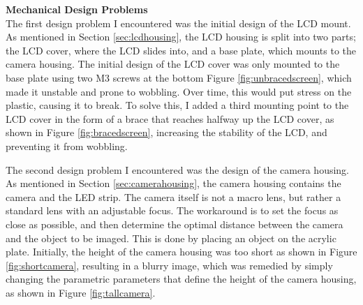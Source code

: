 \noindent
\textbf{Mechanical Design Problems} \\
The first design problem I encountered was the initial design of the LCD mount. As mentioned in Section \ref*{sec:lcdhousing},
the LCD housing is split into two parts; the LCD cover, where the LCD slides into, and a base plate, which mounts to the camera housing.
The initial design of the LCD cover was only mounted to the base plate using two M3 screws at the bottom Figure \ref*{fig:unbracedscreen}, which made it unstable and prone to wobbling.
Over time, this would put stress on the plastic, causing it to break. To solve this, I added a third mounting point to the LCD cover in the form of a 
brace that reaches halfway up the LCD cover, as shown in Figure \ref*{fig:bracedscreen}, increasing the stability of the LCD, and preventing it from wobbling.

The second design problem I encountered was the design of the camera housing. As mentioned in Section \ref*{sec:camerahousing}, the camera housing contains the camera and the LED strip.
The camera itself is not a macro lens, but rather a standard lens with an adjustable focus. The workaround is to set the focus as close as possible, and then determine the optimal
distance between the camera and the object to be imaged. This is done by placing an object on the acrylic plate. Initially, the height of the camera housing was too short as shown in Figure \ref*{fig:shortcamera}, resulting in a 
blurry image, which was remedied by simply changing the parametric parameters that define the height of the camera housing, as shown in Figure \ref*{fig:tallcamera}. 

